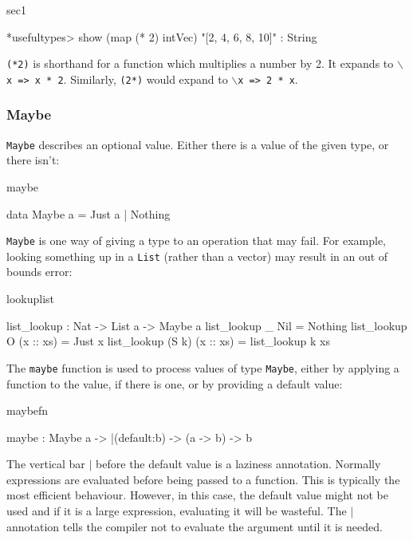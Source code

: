 \begin{SaveVerbatim}{sec1}

*usefultypes> show (map (* 2) intVec)
"[2, 4, 6, 8, 10]" : String

\end{SaveVerbatim}

\noindent
\texttt{(*2)} is shorthand for a function which multiplies a number by 2. It expands to
\texttt{$\backslash$x => x * 2}. 
Similarly, \texttt{(2*)} would expand to \texttt{$\backslash$x => 2 * x}.

\subsubsection{Maybe}

\texttt{Maybe} describes an optional value. Either there is a value of the given type,
or there isn't:

\begin{SaveVerbatim}{maybe}

data Maybe a = Just a | Nothing

\end{SaveVerbatim}

\noindent
\texttt{Maybe} is one way of giving a type to an operation that may fail. For example,
looking something up in a \texttt{List} (rather than a vector) may result in an out of
bounds error:

\begin{SaveVerbatim}{lookuplist}

list_lookup : Nat -> List a -> Maybe a
list_lookup _     Nil       = Nothing
list_lookup O     (x :: xs) = Just x
list_lookup (S k) (x :: xs) = list_lookup k xs

\end{SaveVerbatim}

\noindent
The \texttt{maybe} function is used to process values of type \texttt{Maybe}, 
either by applying a function to the value, if there is one, or by providing a default value:

\begin{SaveVerbatim}{maybefn}

maybe : Maybe a -> |(default:b) -> (a -> b) -> b

\end{SaveVerbatim}

\noindent
The vertical bar $\mid$ before the default value is a laziness annotation. Normally
expressions are evaluated before being passed to a function. This is typically
the most efficient behaviour. However, in this case, the default value might
not be used and if it is a large expression, evaluating it will be wasteful.
The $\mid$ annotation tells the compiler not to evaluate the argument until it is
needed.

